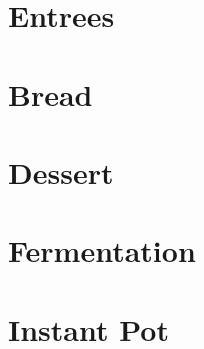 \documentclass{article}
\begin{document}
\newpage
\section{Entrees}



\newpage


\newpage


\newpage


\newpage
\section{Bread}



\newpage


\newpage


\newpage


\newpage



\newpage



\newpage
\section{Dessert}


\newpage


\newpage






\newpage




\newpage



\newpage
\section{Fermentation}


\section{Instant Pot}
\end{document}
